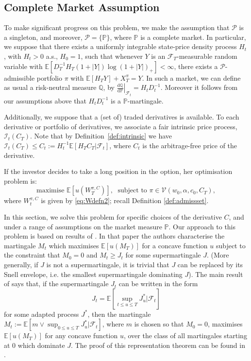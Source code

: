 \documentclass[a4paper]{amsart}
\theoremstyle{definition}
\theoremstyle{remark}
\numberwithin{equation}{section}
\newcommand{\E}{\mathbb{E}}
\renewcommand{\P}{\mathbb{P}}
\newcommand{\Q}{\mathbb{Q}}
\newcommand{\di}{\mathrm{d}}
\newcommand{\as}{a.s.}
\newcommand{\ie}{i.e.}
\newcommand{\Fc}{\mathcal{F}}
\newcommand{\Ep}[1]{\E\left[#1\right]}
\newcommand{\Pc}{\mathcal{P}}
\newcommand{\Vc}{\mathcal{V}}
\newcommand{\In}{\mathcal{I}} %
\begin{document}
\subsection{Complete Market Assumption}

To make significant progress on this problem, we make the assumption that $\Pc$ is a singleton, and moreover, $\Pc = \{ \P\}$, where $\P$ is a complete market. In particular, we suppose that there exists a uniformly integrable state-price density process $H_t$, with $H_t > 0$ \as{}, $H_0 = 1$, such that whenever $Y$ is an $\Fc_T$-measurable random variable with $\Ep{D_T^{-1}H_T (1+|Y|) \log \left(1+|Y|\right)_+}<\infty$, there exists a $\mathcal{P}$-admissible portfolio $\pi$ with $\Ep{H_T Y} + X_T^\pi = Y$. In such a market, we can define as usual a risk-neutral measure $\Q$, by $\left.\frac{\di \Q}{\di \P}\right|_{\Fc_t} = H_t D_t^{-1}$. Moreover it follows from our assumptions above that $ H_t D_t^{-1}$ is a $\P$-martingale.


Additionally, we suppose that  a (set of) traded derivatives is available. To each derivative or portfolio of derivatives, we associate a fair intrinsic price process, $\In_t(C_T)$. Note that by Definition~\ref{def:intrinsic} we have $\In_t(C_T) \le C_t := H_t^{-1} \Ep{H_T C_T | \Fc_t}$, where $C_t$ is the arbitrage-free price of the derivative.

If the investor decides to take a long position in the option, her optimisation problem is:
\begin{equation}\label{eq:2}
  \text{maximise } \Ep{u(W_T^{\pi,C})}, \; \text{ subject to } \pi \in \Vc(w_0, \alpha, c_0, C_T),
\end{equation}
where $W_t^{\pi,C}$ is given by \eqref{eq:Wdefn2}; recall Definition \ref{def:admissset}.

In this section, we solve this problem for specific choices of the derivative $C$, and under a range of assumptions on the market measure $\P$. Our approach to this problem is based on results of \cite{El-Karoui:2006aa}. In that paper the authors characterise the martingale $M_t$ which maximises $\Ep{u(M_T)}$ for a concave function $u$ subject to the constraint that $M_0 = 0$ and $M_t \ge J_t$ for some supermartingale $J$. (More generally, if $J$ is not a supermartingale, it is trivial that $J$ can be replaced by its Snell envelope, \ie{} the smallest supermartingale dominating $J$). The main result of \cite{El-Karoui:2006aa} says that, if the supermartingale $J_t$ can be written in the form
\begin{equation}\label{Representation}
  J_t = \Ep{\sup_{t \le u \le T} J^*_u | \Fc_t}
\end{equation}
for some adapted process $J^*$, then the martingale $M_t := \Ep{m \vee \sup_{0 \le u \le T} J^*_u | \Fc_t}$, where $m$ is chosen so that $M_0 = 0$, maximises $\Ep{u(M_T)}$ for any concave function $u$, over the class of all martingales starting at $0$ which dominate $J$. The proof of this representation theorem can be found in \cite{El-Karoui:2008aa}.
\end{document}
